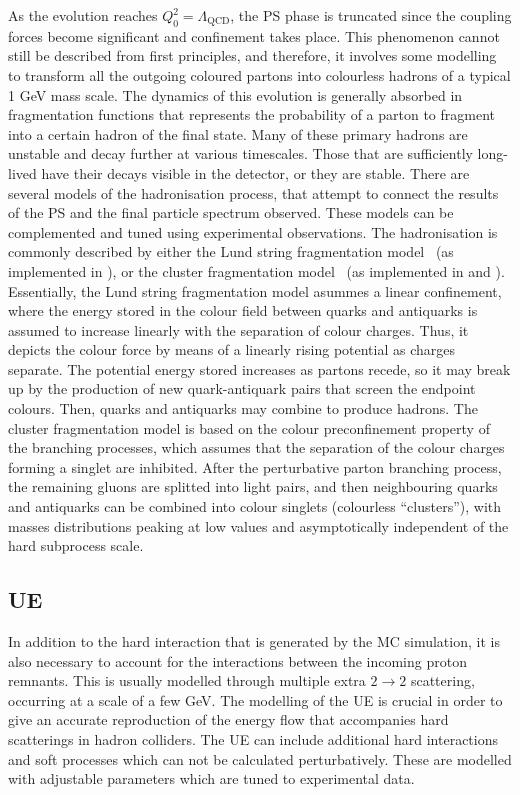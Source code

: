 As the evolution reaches \(Q^2_0 = \Lambda_{\text{QCD}} \), the \ac{PS} phase is truncated since the coupling forces become significant and confinement takes place. This phenomenon cannot still be described from first principles, and therefore, it involves some modelling to transform all the outgoing coloured partons into colourless hadrons of a typical 1 GeV mass scale. The dynamics of this evolution is generally absorbed in fragmentation functions that represents the probability of a parton to fragment into a certain hadron of the final state. Many of these primary hadrons are unstable and decay further at various timescales. Those that are sufficiently long-lived have their decays visible in the detector, or they are stable. There are several models of the hadronisation process, that attempt to connect the results of the \ac{PS} and the final particle spectrum observed. These models can be complemented and tuned using experimental observations. The hadronisation is commonly described by either the Lund string fragmentation model~\cite{Anderson-1983} (as implemented in \Pythia), or the cluster fragmentation model~\cite{Webber-1984} (as implemented in \Herwig and \Sherpa). Essentially, the Lund string fragmentation model asummes a linear confinement, where the energy stored in the colour field between quarks and antiquarks is assumed to increase linearly with the separation of colour charges. Thus, it depicts the colour force by means of a linearly rising potential as charges separate. The potential energy stored increases as partons recede, so it may break up by the production of new quark-antiquark pairs that screen the endpoint colours. Then, quarks and antiquarks may combine to produce hadrons. The cluster fragmentation model is based on the colour preconfinement property of the branching processes, which assumes that the separation of the colour charges forming a singlet are inhibited. After the perturbative parton branching process, the remaining gluons are splitted into light \qqbar pairs, and then neighbouring quarks and antiquarks can be combined into colour singlets (colourless “clusters”), with masses distributions peaking at low values and asymptotically independent of the hard subprocess scale.


\subsection{\acf{UE}}

In addition to the hard interaction that is generated by the \ac{MC} simulation, it is also necessary to account for the interactions between the incoming proton remnants. This is usually modelled through multiple extra \(2 \to 2\) scattering, occurring at a scale of a few GeV. The modelling of the \ac{UE} is crucial in order to give an accurate reproduction of the energy flow that accompanies hard scatterings in hadron colliders. The \ac{UE} can include additional hard interactions and soft processes which can not be calculated perturbatively. These are modelled with adjustable parameters which are tuned to experimental data.



